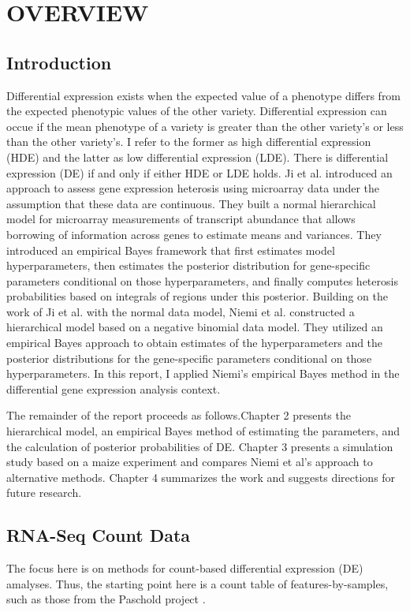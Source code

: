 \chapter{OVERVIEW}



\section{Introduction}

Differential expression exists when the expected value of a phenotype differs from the expected phenotypic values of the other variety. Differential expression can occue if the mean phenotype of a variety is greater than the other variety's or less than the other variety's. I refer to the former as high differential expression (HDE) and the latter as low differential expression (LDE). There is differential expression (DE) if and only if either HDE or LDE holds. Ji et al. \cite{ji2014estimation} introduced an approach to assess gene expression heterosis using microarray data under the assumption that these data are continuous. They built a normal hierarchical model for microarray measurements of transcript abundance that allows borrowing of information across genes to estimate means and variances. They introduced an empirical Bayes framework that first estimates model hyperparameters, then estimates the posterior distribution for gene-specific parameters conditional on those hyperparameters, and finally computes heterosis probabilities based on integrals of regions under this posterior. Building on the work of Ji et al. with the normal data model, Niemi et al. \cite{niemi2015empirical} constructed a hierarchical model based on a negative binomial data model. They utilized an empirical Bayes approach to obtain estimates of the hyperparameters and the posterior distributions for the gene-specific parameters conditional on those hyperparameters. In this report, I applied Niemi's empirical Bayes method in the differential gene expression analysis context. 


The remainder of the report proceeds as follows.Chapter 2 presents the hierarchical model, an empirical Bayes method of estimating the parameters, and the calculation of posterior probabilities of DE. Chapter 3 presents a simulation study based on a maize experiment and compares Niemi et al's approach to alternative methods. Chapter 4 summarizes the work and suggests directions for future research.


\section{RNA-Seq Count Data}
The focus here is on methods for count-based differential expression (DE) amalyses. Thus, the starting point here is a count table of features-by-samples, such as those from the Paschold project \cite{paschold2012complementation}.

